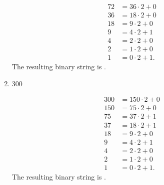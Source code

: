 \documentclass[letterpaper]{article}
\begin{document}
\begin{mdframed}
\begin{enumerate}
\begin{mdframed}
\begin{equation*}
\begin{aligned}
                    72 &= 36 \cdot 2 + 0 \\ 
                    36 &= 18 \cdot 2 + 0 \\ 
                    18 &= 9 \cdot 2 + 0 \\ 
                    9 &= 4 \cdot 2 + 1 \\ 
                    4 &= 2 \cdot 2 + 0 \\ 
                    2 &= 1 \cdot 2 + 0 \\ 
                    1 &= 0 \cdot 2 + 1.
                \end{aligned}
            \end{equation*}
            The resulting binary string is .
        \end{mdframed}
        \item 300 
        \begin{mdframed}
            \begin{equation*}
                \begin{aligned}
                    300 &= 150 \cdot 2 + 0 \\ 
                    150 &= 75 \cdot 2 + 0 \\ 
                    75 &= 37 \cdot 2 + 1 \\ 
                    37 &= 18 \cdot 2 + 1 \\ 
                    18 &= 9 \cdot 2 + 0 \\ 
                    9 &= 4 \cdot 2 + 1 \\ 
                    4 &= 2 \cdot 2 + 0 \\ 
                    2 &= 1 \cdot 2 + 0 \\ 
                    1 &= 0 \cdot 2 + 1.
                \end{aligned}
            \end{equation*}
            The resulting binary string is .
        \end{mdframed}
    \end{enumerate}
\end{mdframed}
\end{document}
